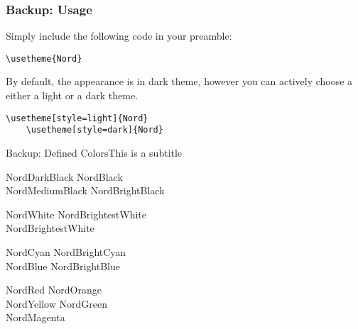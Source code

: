 \documentclass[compress,aspectratio=169]{beamer}
\begin{document}
\begin{frame}[fragile]
  \frametitle{Backup: Usage}
  Simply include the following code in your preamble:

  \begin{lstlisting}[basicstyle = \ttfamily\small]
    \usetheme{Nord}
  \end{lstlisting}

  \bigskip

  By default, the appearance is in dark theme, however you can actively choose a either a light or a
  dark theme.

  \begin{lstlisting}[basicstyle = \ttfamily\small]
    \usetheme[style=light]{Nord}
    \usetheme[style=dark]{Nord}
  \end{lstlisting}

\end{frame}

\begin{frame}{Backup: Defined Colors}{This is a subtitle}
  \begin{description}
  \item[Polar Night]
    \textcolor{NordDarkBlack}{NordDarkBlack} \quad \textcolor{NordBlack}{NordBlack}\\
    \textcolor{NordMediumBlack}{NordMediumBlack} \quad \textcolor{NordBrightBlack}{NordBrightBlack}
  \item[Snow Storm]
    \textcolor{NordWhite}{NordWhite} \quad \textcolor{NordBrighterWhite}{NordBrightestWhite}\\
    \textcolor{NordBrightestWhite}{NordBrightestWhite}
  \item[Forest]
    \textcolor{NordCyan}{NordCyan} \quad \textcolor{NordBrightCyan}{NordBrightCyan}\\
    \textcolor{NordBlue}{NordBlue} \quad \textcolor{NordBrightBlue}{NordBrightBlue}
  \item[Aurora]
    \textcolor{NordRed}{NordRed} \quad \textcolor{NordOrange}{NordOrange} \\
    \textcolor{NordYellow}{NordYellow} \quad \textcolor{NordGreen}{NordGreen} \\
    \textcolor{NordMagenta}{NordMagenta}
  \end{description}
\end{frame}
\end{document}
